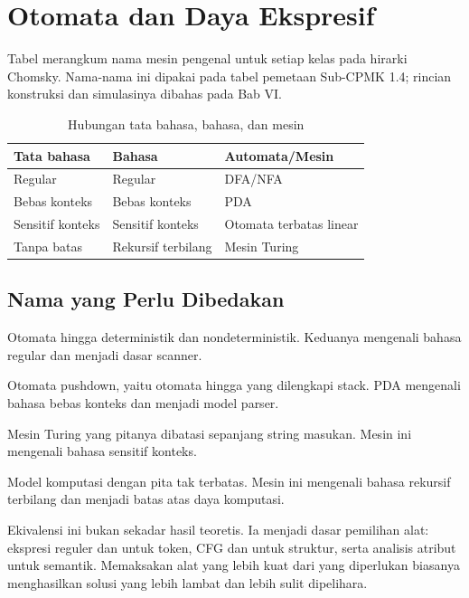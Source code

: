 \section{Otomata dan Daya Ekspresif}
\label{sec:ch04-otomata}

Tabel  merangkum nama mesin pengenal untuk
setiap kelas pada hirarki Chomsky. Nama-nama ini dipakai pada tabel
pemetaan Sub-CPMK 1.4; rincian konstruksi dan simulasinya dibahas pada
Bab VI.

\begin{table}[H]
\centering
\caption{Hubungan tata bahasa, bahasa, dan mesin}
\label{tab:ch04-ekivalensi}
\begin{tabularx}{\textwidth}{@{}l X l@{}}
\toprule
\textbf{Tata bahasa} & \textbf{Bahasa} & \textbf{Automata/Mesin} \\
\midrule
Regular & Regular & DFA/NFA \\
Bebas konteks & Bebas konteks & PDA \\
Sensitif konteks & Sensitif konteks & Otomata terbatas linear \\
Tanpa batas & Rekursif terbilang & Mesin Turing \\
\bottomrule
\end{tabularx}
\end{table}

\subsection{Nama yang Perlu Dibedakan}

\begin{description}[leftmargin=*]
  \item[DFA/NFA] Otomata hingga deterministik dan nondeterministik.
        Keduanya mengenali bahasa regular dan menjadi dasar scanner.
  \item[PDA] Otomata pushdown, yaitu otomata hingga yang dilengkapi
        stack. PDA mengenali bahasa bebas konteks dan menjadi model
        parser.
  \item[Otomata terbatas linear] Mesin Turing yang pitanya dibatasi
        sepanjang string masukan. Mesin ini mengenali bahasa sensitif
        konteks.
  \item[Mesin Turing] Model komputasi dengan pita tak terbatas. Mesin
        ini mengenali bahasa rekursif terbilang dan menjadi batas atas
        daya komputasi.
\end{description}

Ekivalensi ini bukan sekadar hasil teoretis. Ia menjadi dasar
pemilihan alat: ekspresi reguler dan  untuk
token, CFG dan  untuk struktur, serta analisis
atribut untuk semantik. Memaksakan alat yang lebih kuat dari yang
diperlukan biasanya menghasilkan solusi yang lebih lambat dan lebih
sulit dipelihara.
